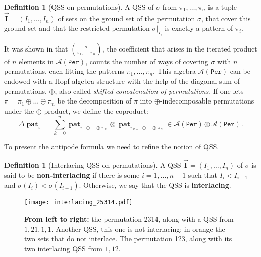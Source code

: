 \documentclass[submission]{FPSAC2023}
\theoremstyle{definition}
\newtheorem{defin}[thm]{Definition}
\newcommand{\III}{\vec{\mathbf{I}}}
\DeclareMathOperator{\pat}{\mathbf{pat}}
\begin{document}
\begin{defin}[QSS on permutations]\label{defin:QSS}
A QSS of $\sigma$ from $\pi_1, \dots, \pi_n$ is a tuple $\III = (I_1, \dots, I_n)$ of sets on the ground set of the permutation $\sigma$, that cover this ground set and that the restricted permutation $\sigma|_{I_i}$ is exactly a pattern of $\pi_i$.
\end{defin}
It was shown in \cite{Penaguiao2020} that $\binom{\sigma}{\pi_1, \dots, \pi_n}$, the coefficient that arises in the iterated product of $n$ elements in $\mathcal A(\mathtt{Per})$, counts the number of ways of covering $\sigma$ with $n$ permutations, each fitting the patterns $\pi_1, \dots, \pi_n$.
This algebra $\mathcal A(\mathtt{Per})$ can be endowed with a Hopf algebra structure with the help of the diagonal sum of permutations, $\oplus$, also called \emph{shifted concatenation of permutations}.
If one lets $\pi = \pi_1 \oplus \dots \oplus \pi_n$ be the decomposition of $\pi$ into $\oplus$-indecomposable permutations under the $\oplus$ product, we define the coproduct:
$$\Delta \pat_{\pi} = \sum_{k=0}^n \pat_{\pi_1\oplus \dots \oplus \pi_k} \otimes \pat_{\pi_{k+1}\oplus \dots \oplus \pi_n} \in \mathcal A (\mathtt{Per}) \otimes \mathcal A (\mathtt{Per})\, .$$

To present the antipode formula we need to refine the notion of QSS.
\begin{defin}[Interlacing QSS on permutations]
A QSS $\III = (I_1, \dots, I_n)$ of $\sigma$ is said to be \textbf{non-interlacing} if there is some $i=1, \dots, n-1$ such that $I_i < I_{i+1}$ and $\sigma(I_i) < \sigma(I_{i+1})$.
Otherwise, we say that the QSS is \textbf{interlacing}. 
\end{defin}

\begin{figure}[h]
    \centering
    \texttt{[image: interlacing\_25314.pdf]}
    \caption{\textbf{From left to right:} the permutation 2314, along with a QSS from $1, 21, 1, 1$. Another QSS, this one is not interlacing: in orange the two sets that do not interlace. The permutation 123, along with its two interlacing QSS from $1, 12$.\label{fig:interlacingQSSsmpl}}
\end{figure}

\vspace{-.2in}
\end{document}

